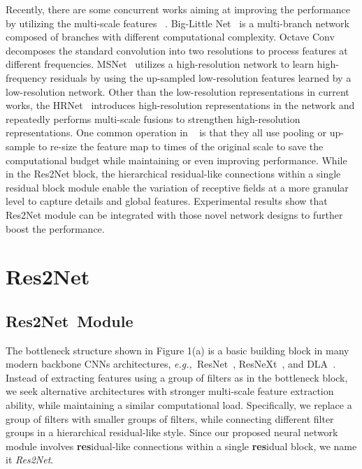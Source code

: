 \documentclass[10pt,journal,cspaper,compsoc]{IEEEtran}
\newcommand{\figref}[1]{Figure 1}\newcommand{\tabref}[1]{Table 1}\newcommand{\secref}[1]{Section 1}
\newcommand{\figref}[1]{Fig.~\ref{#1}}\newcommand{\tabref}[1]{Table~\ref{#1}}\newcommand{\secref}[1]{Sec.~\ref{#1}}
\newcommand{\ourM}{{Res2Net}}
\def\eg{\emph{e.g.,~}}
\begin{document}
Recently, there are some concurrent works aiming at improving the performance
by utilizing the multi-scale features
~\cite{chen2019drop,chen2018biglittle,cheng2019high,SunZJCXLMWLW19}.
Big-Little Net~\cite{chen2018biglittle} is a multi-branch network 
composed of branches with different computational complexity.
Octave Conv~\cite{chen2019drop} decomposes the standard convolution into 
two resolutions to process features at different frequencies.
MSNet~\cite{cheng2019high} utilizes a high-resolution network to learn
high-frequency residuals by using the up-sampled low-resolution features 
learned by a low-resolution network.
Other than the low-resolution representations in current works, 
the HRNet~\cite{SunXLW19,SunZJCXLMWLW19} introduces high-resolution
representations in the network and repeatedly performs multi-scale 
fusions to strengthen high-resolution representations.
One common operation in
~\cite{chen2019drop,chen2018biglittle,cheng2019high,SunXLW19,SunZJCXLMWLW19} 
is that they all use pooling or up-sample
to re-size the feature map to  times of the original scale 
to save the computational budget while maintaining or even improving performance.
While in the Res2Net block, the hierarchical
residual-like connections within a single residual
block module enable the variation of receptive fields 
at a more granular level to capture details and global features.
Experimental results show that Res2Net module can be integrated 
with those novel network designs to further boost the performance.










\section{\ourM}

\subsection{\ourM~Module}

The bottleneck structure shown in \figref{fig:structure}(a)
is a basic building block in many modern backbone CNNs architectures,
\eg ResNet~\cite{he2016deep}, ResNeXt~\cite{xie2017aggregated},
and DLA~\cite{yu2018deep}.
Instead of extracting features using a group of  filters
as in the bottleneck block,
we seek alternative architectures with stronger multi-scale feature
extraction ability,
while maintaining a similar computational load.
Specifically, we replace a group of  filters
with smaller groups of filters,
while connecting different filter groups in a hierarchical residual-like style.
Since our proposed neural network module involves 
\textbf{res}idual-like connections
within a single \textbf{res}idual block, we name it \emph{\ourM}.
\end{document}
